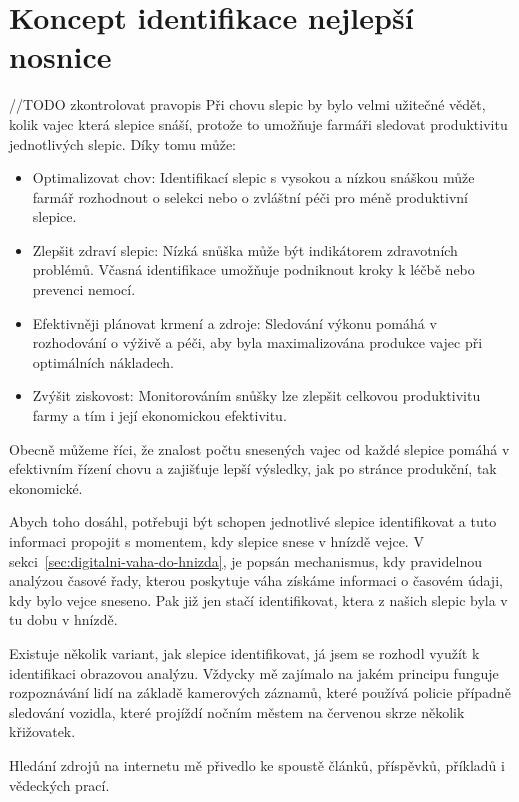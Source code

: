 \section{Koncept identifikace nejlepší nosnice}\label{sec:koncept-identifikace-nejlepsi-nosnice}
//TODO zkontrolovat pravopis\newline
Při chovu slepic by bylo velmi užitečné vědět, kolik vajec která slepice snáší, protože to umožňuje farmáři sledovat produktivitu jednotlivých slepic.
Díky tomu může:
\begin{itemize}
    \item Optimalizovat chov: Identifikací slepic s vysokou a nízkou snáškou může farmář rozhodnout o selekci nebo o zvláštní péči pro méně produktivní slepice.
    \item Zlepšit zdraví slepic: Nízká snůška může být indikátorem zdravotních problémů.
    Včasná identifikace umožňuje podniknout kroky k léčbě nebo prevenci nemocí.
    \item Efektivněji plánovat krmení a zdroje: Sledování výkonu pomáhá v rozhodování o výživě a péči, aby byla maximalizována produkce vajec při optimálních nákladech.
    \item Zvýšit ziskovost: Monitorováním snůšky lze zlepšit celkovou produktivitu farmy a tím i její ekonomickou efektivitu.
\end{itemize}

Obecně můžeme říci, že znalost počtu snesených vajec od každé slepice pomáhá v efektivním řízení chovu a zajišťuje lepší výsledky, jak po stránce produkční, tak ekonomické.

Abych toho dosáhl, potřebuji být schopen jednotlivé slepice identifikovat a tuto informaci propojit s momentem, kdy slepice snese v hnízdě vejce.
V sekci~\ref{sec:digitalni-vaha-do-hnizda}, je popsán mechanismus, kdy pravidelnou analýzou časové řady, kterou poskytuje váha získáme informaci o časovém údaji, kdy bylo vejce sneseno.
Pak již jen stačí identifikovat, ktera z našich slepic byla v tu dobu v hnízdě.

Existuje několik variant, jak slepice identifikovat, já jsem se rozhodl využít k identifikaci obrazovou analýzu.
Vždycky mě zajímalo na jakém principu funguje rozpoznávání lidí na základě kamerových záznamů, které používá policie případně sledování vozidla, které projíždí nočním městem na červenou skrze několik křižovatek.

Hledání zdrojů na internetu mě přivedlo ke spoustě článků, příspěvků, příkladů i vědeckých prací.

